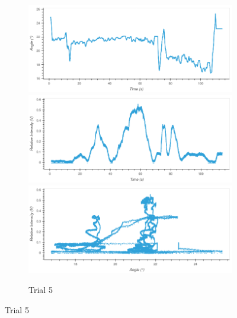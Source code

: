 \begin{figure}
\begin{subfigure}{1.0\textwidth}
\caption{Trial 5}
\includegraphics[width=\plotwidth]{plots/t6-time-angle.png}
\includegraphics[width=\plotwidth]{plots/t6-time-intensity.png}
\includegraphics[width=\plotwidth]{plots/t6-angle-intensity.png}
\end{subfigure}




\end{figure}
